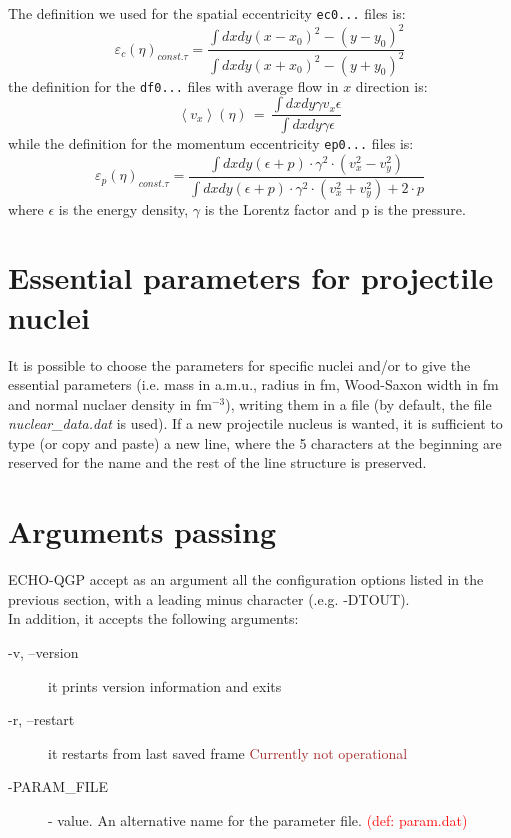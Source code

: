 \begin{description}
The definition we used for the spatial eccentricity {\tt ec0...} files is:
\begin{displaymath}
\varepsilon_c (\eta)_{const. \tau}=\frac{\int dxdy (x-x_0)^2-(y-y_0)^2 }{\int dxdy (x+x_0)^2-(y+y_0)^2 }
\end{displaymath}
the definition for the {\tt df0...} files with average flow in $x$ direction is:
\begin{displaymath}
\left< v_x \right>(\eta)\,=\,\frac{\int dxdy \gamma v_x \epsilon }{\int  dxdy \gamma \epsilon}
\end{displaymath}
while the definition \cite{Bozek2010} for the momentum eccentricity {\tt ep0...} files is: 
\begin{displaymath}
\varepsilon_p(\eta)_{const. \tau}=\frac{\int dxdy (\epsilon + p ) \cdot \gamma^2 \cdot (v_x^2-v_y^2)}{\int dxdy (\epsilon + p) \cdot \gamma^2 \cdot (v_x^2+v_y^2)+2 \cdot p }
\end{displaymath}
where $\epsilon$ is the energy density, $\gamma$ is the Lorentz factor and p is the pressure.
\end{description}

\section{Essential parameters for projectile nuclei}
It is possible to choose the parameters for specific nuclei and/or to give the essential parameters (i.e. mass in a.m.u., radius in fm, Wood-Saxon width in fm and normal nuclaer density in fm$^{-3}$), writing them in a file (by default, the file \emph{nuclear\_data.dat} is used). If a new projectile nucleus is wanted, it is sufficient to type (or copy and paste) a new line, where the 5 characters at the beginning are reserved for the name and the rest of the line structure is preserved.

\section{Arguments passing}
ECHO-QGP accept as an argument all the configuration options listed in the previous section, with a leading minus character (.e.g. -DTOUT).\\
In addition, it accepts the following arguments:
\begin{description}
	\item[-v, --version] it prints version information and exits
	\item[-r, --restart] it restarts from last saved frame \textcolor{brown}{Currently not operational}
	\item[-PARAM\_FILE] \chara - value. An alternative name for the parameter file. \textcolor{red}{(def: param.dat)}
\end{description}

